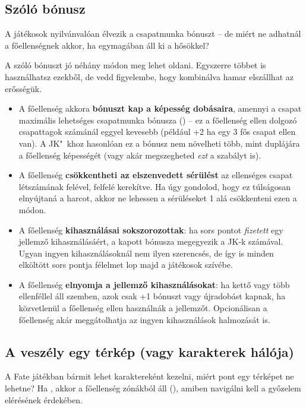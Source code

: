 \subsection{Szóló bónusz}

A játékosok nyilvánvalóan élvezik a csapatmunka bónuszt – de miért ne adhatnál a főellenségnek  akkor, ha egymagában áll ki a hősökkel?

A szóló bónuszt jó néhány módon meg lehet oldani. Egyszerre többet is használhatsz ezekből, de vedd figyelembe, hogy kombinálva hamar elszállhat az erősségük.

\begin{itemize}
    \item A főellenség akkora \textbf{bónuszt kap a képesség dobásaira}, amennyi a csapat maximális lehetséges csapatmunka bónusza () – ez a főellenség ellen dolgozó csapattagok számánál eggyel kevesebb (például +2 ha egy 3 fős csapat ellen van). A JK"~khoz hasonlóan ez a bónusz nem növelheti több, mint duplájára a főellenség képességét (vagy akár megszegheted \emph{ezt} a szabályt is).
    \item A főellenség \textbf{csökkentheti az elszenvedett sérülést} az ellenséges csapat létszámának felével, felfelé kerekítve. Ha úgy gondolod, hogy ez túlságosan elnyújtaná a harcot, akkor ne lehessen a sérüléseket 1 alá csökkenteni ezen a módon.
    \item A főellenség \textbf{kihasználásai sokszorozottak}: ha sors pontot \emph{fizetett} egy jellemző kihasználásáért, a kapott bónusza megegyezik a JK‑k számával. Ugyan ingyen kihasználásoknál nem ilyen szerencsés, de így is minden elköltött sors pontja félelmet lop majd a játékosok szívébe.
    \item A főellenség \textbf{elnyomja a jellemző kihasználásokat}: ha kettő vagy több ellenféllel áll szemben, azok csak +1 bónuszt vagy újradobást kapnak, ha közvetlenül a főellenség ellen használnák a jellemzőt. Opcionálisan a főellenség akár meggátolhatja az ingyen kihasználások halmozását is.
\end{itemize}

\newpage

\subsection{A veszély egy térkép (vagy karakterek hálója)}

A Fate játékban bármit lehet karaktereként kezelni, miért pont egy térképet ne lehetne? Ha , akkor a főellenség zónákból áll (), amiben navigálni kell a győzelem elérésének érdekében.

